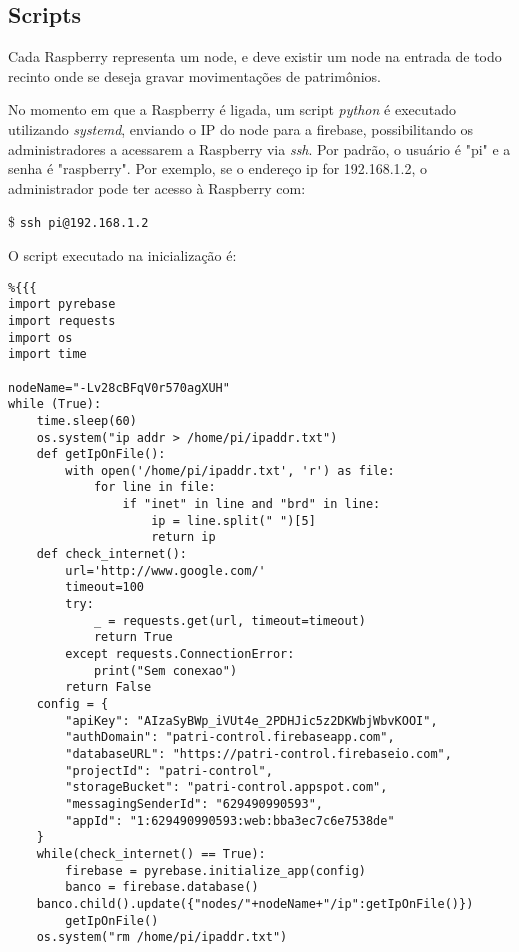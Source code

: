 \documentclass[
	12pt,				%
	openright,			%
	oneside,			%
	a4paper,			%
	english,			%
	french,				%
	spanish,			%
	brazil				%
	]{abntex2}
\begin{document}





\subsection{Scripts}

Cada Raspberry representa um node, e deve existir um node na entrada de todo recinto onde se deseja gravar movimentações de patrimônios.

No momento em que a Raspberry é ligada, um script \emph{python} é executado utilizando \emph{systemd}, enviando o IP do node para a firebase, possibilitando os administradores a acessarem a Raspberry via \emph{ssh}. Por padrão, o usuário é "pi" e a senha é "raspberry". Por exemplo, se o endereço ip for 192.168.1.2, o administrador pode ter acesso à Raspberry com:

{\tiny\$} \lstinline{ssh pi@192.168.1.2}

O script executado na inicialização é:

\begin{lstlisting}%{{{
import pyrebase
import requests
import os
import time

nodeName="-Lv28cBFqV0r570agXUH"
while (True):
    time.sleep(60)
    os.system("ip addr > /home/pi/ipaddr.txt")
    def getIpOnFile():
        with open('/home/pi/ipaddr.txt', 'r') as file:
            for line in file:
                if "inet" in line and "brd" in line:
                    ip = line.split(" ")[5]
                    return ip
    def check_internet():
        url='http://www.google.com/'
        timeout=100
        try:
            _ = requests.get(url, timeout=timeout)
            return True
        except requests.ConnectionError:
            print("Sem conexao")
        return False
    config = {
        "apiKey": "AIzaSyBWp_iVUt4e_2PDHJic5z2DKWbjWbvKOOI",
        "authDomain": "patri-control.firebaseapp.com",
        "databaseURL": "https://patri-control.firebaseio.com",
        "projectId": "patri-control",
        "storageBucket": "patri-control.appspot.com",
        "messagingSenderId": "629490990593",
        "appId": "1:629490990593:web:bba3ec7c6e7538de"
    }
    while(check_internet() == True):
        firebase = pyrebase.initialize_app(config)
        banco = firebase.database()
	banco.child().update({"nodes/"+nodeName+"/ip":getIpOnFile()})
        getIpOnFile()
    os.system("rm /home/pi/ipaddr.txt")
\end{lstlisting}%
\end{document}
